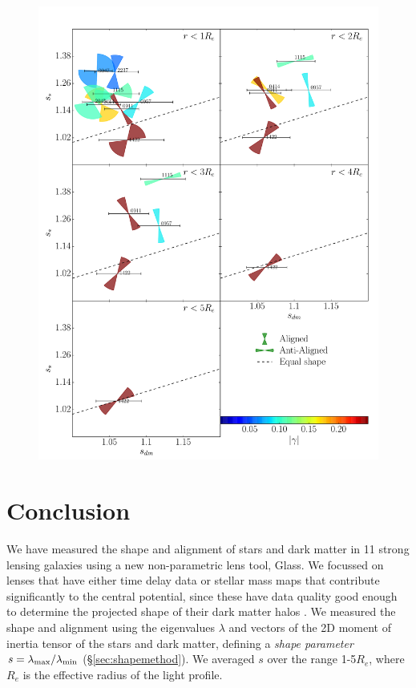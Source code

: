 \documentclass[useAMS,usenatbib]{mn2e}
\def\Glass{{\sc Glass}}
\begin{document}
\begin{figure}
  \centering
  \includegraphics[width=.8\linewidth]{Figures/wedges.pdf}
  \caption[width=.65\linewidth]{}
  \label{fig:wedgesall}
\end{figure}


\section{Conclusion}\label{sec:conclusions}

We have measured the shape and alignment of stars and dark matter in 11 strong lensing galaxies using a new non-parametric lens tool, \Glass. We focussed on lenses that have either time delay data or stellar mass maps that contribute significantly to the central potential, since these have data quality good enough to determine the projected shape of their dark matter halos \citep{2014arXiv1401.7990C}. We measured the shape and alignment using the eigenvalues $\lambda$ and vectors of the 2D moment of inertia tensor of the stars and dark matter, defining a {\it shape parameter} $s = \lambda_{\rm max}/\lambda_{\rm min}$ (\S\ref{sec:shapemethod}). We averaged $s$ over the range 1-5$R_e$, where $R_e$ is the effective radius of the light profile.
\end{document}
